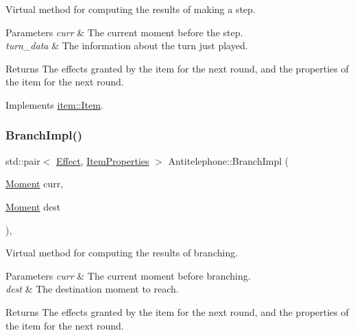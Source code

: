 Virtual method for computing the results of making a step. 


\begin{DoxyParams}{Parameters}
{\em curr} & The current moment before the step. \\
\hline
{\em turn\+\_\+data} & The information about the turn just played. \\
\hline
\end{DoxyParams}
\begin{DoxyReturn}{Returns}
The effects granted by the item for the next round, and the properties of the item for the next round. 
\end{DoxyReturn}


Implements \hyperlink{classitem_1_1_item_a90df61c8a2a20144eb1100af5fb2d464}{item\+::\+Item}.

\mbox{\label{classitem_1_1_antitelephone_a1b094baeb7cae7e1161d1aa1650022d1}} 
\subsubsection{\texorpdfstring{Branch\+Impl()}{BranchImpl()}}
{\footnotesize\ttfamily std\+::pair$<$ \hyperlink{classitem_1_1_effect}{Effect}, \hyperlink{classitem_1_1_item_properties}{Item\+Properties} $>$ Antitelephone\+::\+Branch\+Impl (\begin{DoxyParamCaption}\item[{\hyperlink{classtimeplane_1_1_moment}{Moment}}]{curr,  }\item[{\hyperlink{classtimeplane_1_1_moment}{Moment}}]{dest }\end{DoxyParamCaption})\hspace{0.3cm}{\ttfamily [protected]}, {\ttfamily [virtual]}}



Virtual method for computing the results of branching. 


\begin{DoxyParams}{Parameters}
{\em curr} & The current moment before branching. \\
\hline
{\em dest} & The destination moment to reach. \\
\hline
\end{DoxyParams}
\begin{DoxyReturn}{Returns}
The effects granted by the item for the next round, and the properties of the item for the next round. 
\end{DoxyReturn}


